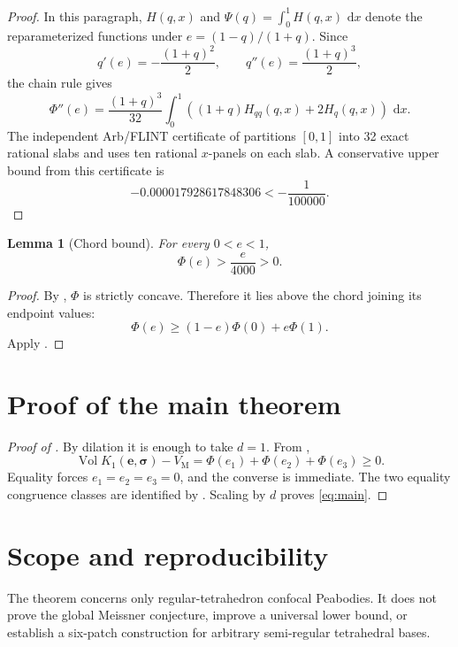 \documentclass[11pt]{article}
\numberwithin{equation}{section}
\newtheorem{lemma}[theorem]{Lemma}
\theoremstyle{remark}
\newcommand{\Vol}{\operatorname{Vol}}
\newcommand{\dd}{\,\mathrm d}
\newcommand{\VM}{V_{\mathrm M}}
\begin{document}
\begin{proof}
In this paragraph, \(H(q,x)\) and \(\Psi(q)=\int_0^1H(q,x)\,\dd x\) denote the reparameterized functions under \(e=(1-q)/(1+q)\).  Since
\[
  q'(e)=-\frac{(1+q)^2}{2},
  \qquad
  q''(e)=\frac{(1+q)^3}{2},
\]
the chain rule gives
\begin{equation}
  \Phi''(e)=\frac{(1+q)^3}{32}
  \int_0^1\left((1+q)H_{qq}(q,x)+2H_q(q,x)\right)\,\dd x.
  \label{eq:concavity-identity}
\end{equation}
The independent Arb/FLINT certificate of  partitions \([0,1]\) into 32 exact rational slabs and uses ten rational \(x\)-panels on each slab. A conservative upper bound from this certificate is
\[
  -0.000017928617848306
  <-\frac1{100000}.
\]
\end{proof}

\begin{lemma}[Chord bound]
\label{lem:chord}
For every \(0<e<1\),
\begin{equation}
  \Phi(e)>\frac e{4000}>0.
  \label{eq:chord-bound}
\end{equation}
\end{lemma}

\begin{proof}
By , \(\Phi\) is strictly concave.  Therefore it lies above the chord joining its endpoint values:
\[
  \Phi(e)\ge(1-e)\Phi(0)+e\Phi(1).
\]
Apply .
\end{proof}

\section{Proof of the main theorem}

\begin{proof}[Proof of ]
By dilation it is enough to take \(d=1\).  From ,
\[
  \Vol K_1(\mathbf e,\boldsymbol\sigma)-\VM
  =\Phi(e_1)+\Phi(e_2)+\Phi(e_3)\ge0.
\]
Equality forces \(e_1=e_2=e_3=0\), and the converse is immediate.  The two equality congruence classes are identified by .  Scaling by \(d\) proves \eqref{eq:main}.
\end{proof}

\section{Scope and reproducibility}

The theorem concerns only regular-tetrahedron confocal Peabodies.  It does not prove the global Meissner conjecture, improve a universal lower bound, or establish a six-patch construction for arbitrary semi-regular tetrahedral bases.
\end{document}
